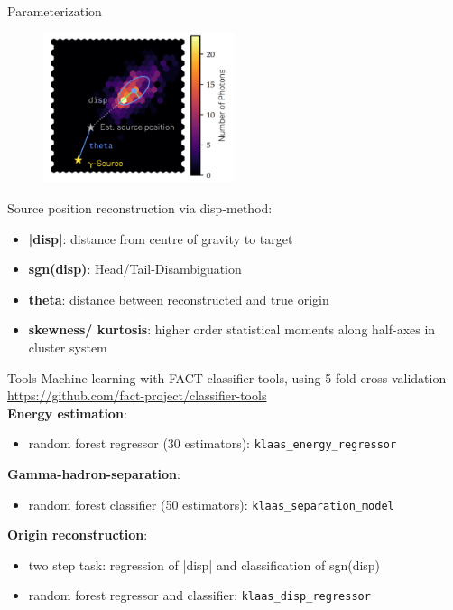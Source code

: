 \begin{frame}[t]{Parameterization}
    \begin{multicols}{2}
        \begin{figure}
            \centering
            \includegraphics[width=0.5\textwidth]{fig/disp.png}
        \end{figure}
    \columnbreak
Source position reconstruction via disp-method:
    \begin{itemize}
        \item \textbf{{\color{tugreen} |disp|}}: distance from centre of gravity to target
        \item \textbf{{\color{tugreen} sgn(disp)}}: Head/Tail-Disambiguation
        \item \textbf{{\color{tugreen} theta}}: distance between reconstructed and true origin
        \item \textbf{{\color{tugreen} skewness/ kurtosis}}: higher order statistical moments along half-axes in cluster system
    \end{itemize}
    \end{multicols}
\end{frame}

\begin{frame}[t]{Tools}
Machine learning with FACT classifier-tools, using 5-fold cross validation  \url{https://github.com/fact-project/classifier-tools} \\
\textbf{{\color{tugreen} Energy estimation}}:
\begin{itemize}
    \item random forest regressor (30 estimators): \texttt{klaas\_energy\_regressor}
\end{itemize}
\textbf{{\color{tugreen} Gamma-hadron-separation}}:
\begin{itemize}
    \item random forest classifier (50 estimators): \texttt{klaas\_separation\_model}
\end{itemize}
\textbf{{\color{tugreen} Origin reconstruction}}:
\begin{itemize}
    \item two step task: regression of |disp| and classification of sgn(disp)
    \item random forest regressor and classifier: \texttt{klaas\_disp\_regressor}
\end{itemize}
\end{frame}

